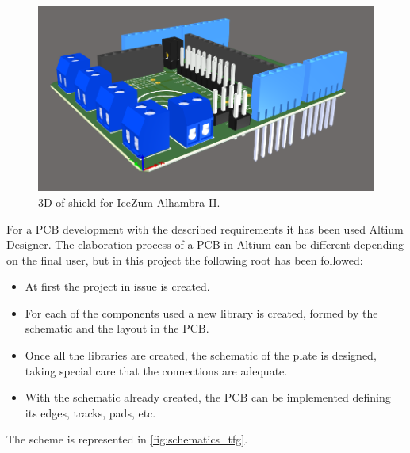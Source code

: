 	\begin{center}
		\begin{figure}[H]
			\center
			\includegraphics[scale=0.6]{imagenes/Balancing_Robot/Vista3D2.PNG}
			\caption{3D of shield for IceZum Alhambra II.}
			\label{fig:Vista3D2}
		\end{figure}
	\end{center}


For a PCB development with the described requirements it has been used Altium Designer. The elaboration process of a PCB in Altium can be different depending on the final user, but in this project the following root has been followed:

\begin{itemize}
	\item At first the project in issue is created.
	\item For each of the components used a new library is created, formed by the schematic and the layout in the PCB.
	\item Once all the libraries are created, the schematic of the plate is designed, taking special care that the connections are adequate.
	\item With the schematic already created, the PCB can be implemented defining its edges, tracks, pads, etc.
\end{itemize}

The scheme is represented in \ref{fig:schematics_tfg}.
\newpage

